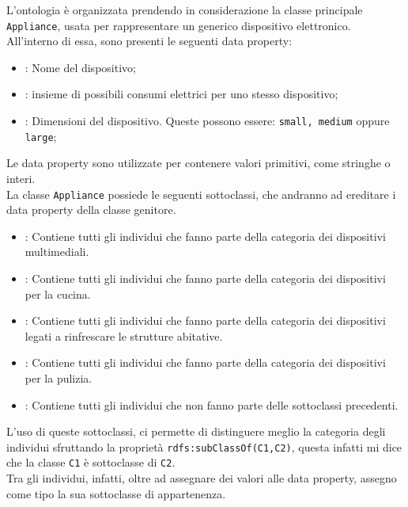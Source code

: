 \documentclass[12pt, letterpaper]{article}
\begin{document}
\noindent L'ontologia è organizzata prendendo in considerazione la classe
principale \texttt{Appliance}, usata per rappresentare un generico dispositivo elettronico.
All'interno di essa, sono presenti le seguenti data property:

\begin{itemize}
      \item {}: Nome del dispositivo;
      \item {}: insieme di possibili consumi elettrici per uno stesso
            dispositivo;
      \item {}: Dimensioni del dispositivo. Queste possono
            essere: \texttt{small, medium} oppure \texttt{large};
\end{itemize}

\noindent Le data property sono utilizzate per contenere valori primitivi, come stringhe o interi. \\

\noindent La classe \texttt{Appliance} possiede le seguenti sottoclassi, che andranno ad ereditare i
data property della classe genitore.

\begin{itemize}
      \item {}: Contiene tutti gli individui che fanno parte della categoria dei dispositivi multimediali.
      \item {}: Contiene tutti gli individui che fanno parte della categoria dei dispositivi per la cucina.
      \item {}: Contiene tutti gli individui che fanno parte della categoria dei dispositivi legati a rinfrescare
            le strutture abitative.
      \item {}: Contiene tutti gli individui che fanno parte della categoria dei dispositivi per la pulizia.
      \item {}: Contiene tutti gli individui che non fanno parte delle sottoclassi precedenti.
\end{itemize}

\noindent L'uso di queste sottoclassi, ci permette di distinguere meglio la categoria degli individui sfruttando
la proprietà \texttt{rdfs:subClassOf(C1,C2)}, questa infatti mi dice che la
classe \texttt{C1} è sottoclasse di \texttt{C2}. \\

\noindent Tra gli individui, infatti, oltre ad assegnare dei valori alle data property, assegno come tipo la sua
sottoclasse di appartenenza.
\end{document}
